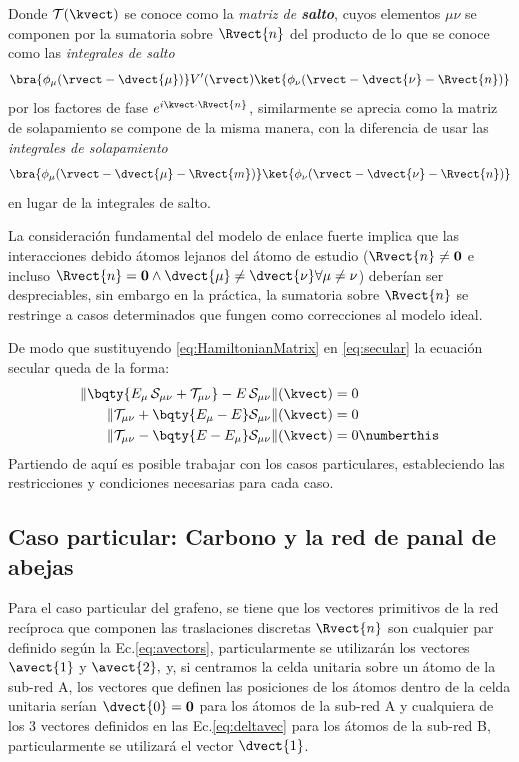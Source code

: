 Donde $ \mathcal{T}(\kvect) $ se conoce como la \emph{matriz de \textbf{salto}}, 
cuyos elementos $ \mu\nu $ se componen por la sumatoria sobre $ \Rvect{n} $ del 
producto de lo que se conoce como las \emph{integrales de salto} 
\[ \bra{\phi_{\mu}(\rvect - \dvect{\mu})}V^\prime(\rvect)\ket{\phi_{\nu}(\rvect - 
	\dvect{\nu} - \Rvect{n})} \] 
por los factores de fase $ e^{i\kvect\cdot\Rvect{n}} $, similarmente se aprecia como 
la matriz de solapamiento se compone de la misma manera, con la diferencia de usar 
las \emph{integrales de solapamiento} 
\[ \bra{\phi_{\mu}(\rvect - \dvect{\mu} - \Rvect{m})}\ket{\phi_{\nu}(\rvect - 
	\dvect{\nu} - \Rvect{n})} \] 
en lugar de la integrales de salto.

La consideración fundamental del modelo de enlace fuerte implica que las 
interacciones debido átomos lejanos del átomo de estudio ($ \Rvect{n}\neq\mathbf0 $ 
e incluso $ \Rvect{n}=\mathbf0 \land \dvect{\mu}\neq\dvect{\nu} \forall \mu\neq\nu 
$) deberían ser despreciables, sin embargo en la práctica, la sumatoria sobre $ 
\Rvect{n} $ se restringe a casos determinados que fungen como correcciones al modelo 
ideal.

De modo que sustituyendo \eqref{eq:HamiltonianMatrix} en \eqref{eq:secular} la 
ecuación secular queda de la forma:
\begin{align*}
\|\bqty{E_\mu\,\mathcal{S}_{\mu\nu} + \mathcal{T}_{\mu\nu}} - E\,\mathcal{S}_{\mu\nu}\|(\kvect) &= 0 \\
\|\mathcal{T}_{\mu\nu}+\bqty{E_\mu-E}\mathcal{S}_{\mu\nu}\|(\kvect) &= 0 \\
\|\mathcal{T}_{\mu\nu}-\bqty{E-E_\mu}\mathcal{S}_{\mu\nu}\|(\kvect) &= 0 \numberthis\label{eq:workedSecular}
\end{align*}
Partiendo de aquí es posible trabajar con los casos particulares, estableciendo las 
restricciones y condiciones necesarias para cada caso.

\subsection{Caso particular: Carbono y la red de panal de abejas}

Para el caso particular del grafeno, se tiene que los vectores primitivos de la red 
recíproca que componen las traslaciones discretas $ \Rvect{n} $ son cualquier par 
definido según la Ec.\eqref{eq:avectors}, particularmente se utilizarán los vectores 
$ \avect{1} $ y  $ \avect{2} ,$ y, si centramos la celda unitaria sobre un átomo de 
la sub-red A, los vectores que definen las posiciones de los átomos dentro de la 
celda unitaria serían $ \dvect{0} = \mathbf0 $ para los átomos de la sub-red A y 
cualquiera de los 3 vectores definidos en las Ec.\eqref{eq:deltavec} para los átomos 
de la sub-red B, particularmente se utilizará el vector $ \dvect{1} $.

